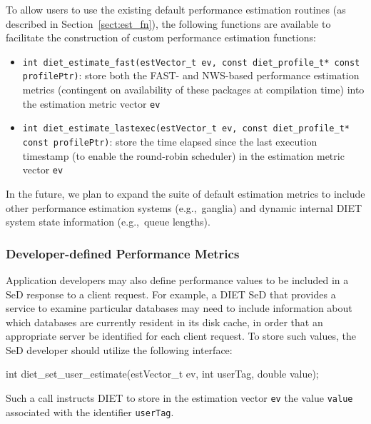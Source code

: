 To allow users to use the existing default performance estimation
routines (as described in Section~\ref{sect:est_fn}), the following
functions are available to facilitate the construction of custom
performance estimation functions:
\begin{itemize}
\item\texttt{int diet\_estimate\_fast(estVector\_t ev, const diet\_profile\_t* const profilePtr)}:
  store both the FAST- and NWS-based performance estimation metrics
  (contingent on availability of these packages at compilation time)
  into the estimation metric vector \texttt{ev}
\item\texttt{int diet\_estimate\_lastexec(estVector\_t ev,
                           const diet\_profile\_t* const profilePtr)}:
  store the time elapsed since the last execution timestamp (to enable
  the round-robin scheduler) in the estimation metric vector \texttt{ev}
\end{itemize}

In the future, we plan to expand the suite of default estimation
metrics to include other performance estimation systems
(e.g.,~ganglia) and dynamic internal DIET system state information
(e.g.,~queue lengths).

\subsubsection{Developer-defined Performance Metrics}

Application developers may also define performance values to be
included in a SeD response to a client request.  For example, a DIET
SeD that provides a service to examine particular databases may need
to include information about which databases are currently resident in
its disk cache, in order that an appropriate server be identified for
each client request.  To store such values, the SeD developer should
utilize the following interface:
\begin{code}
int diet\_set\_user\_estimate(estVector\_t ev, int userTag, double value);
\end{code}
Such a call instructs DIET to store in the estimation vector
\texttt{ev} the value \texttt{value} associated with the identifier
\texttt{userTag}.


